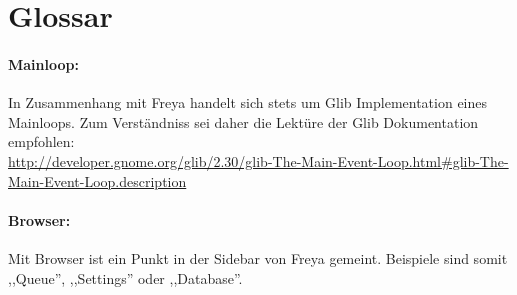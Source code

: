 \newpage
\section{Glossar}
\paragraph{Mainloop:}
In Zusammenhang mit Freya handelt sich stets um Glib Implementation eines Mainloops.
Zum Verständniss sei daher die Lektüre der Glib Dokumentation empfohlen:\\
\url{http://developer.gnome.org/glib/2.30/glib-The-Main-Event-Loop.html#glib-The-Main-Event-Loop.description}
\paragraph{Browser:}
Mit Browser ist ein Punkt in der Sidebar von Freya gemeint. Beispiele sind somit ,,Queue'', ,,Settings'' oder ,,Database''.

